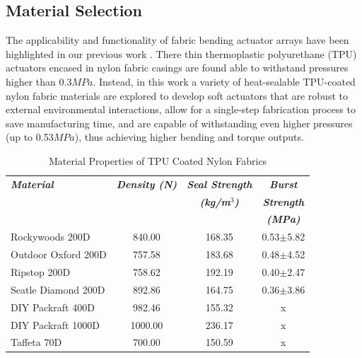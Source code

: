 \documentclass[letterpaper, 10 pt, conference]{ieeeconf}  %
\begin{document}
\subsection{Material Selection}
\label{sec:mat_select}

The applicability and functionality of fabric bending actuator arrays have been highlighted in our previous work \cite{carly2018}. There thin thermoplastic polyurethane (TPU) actuators encased in nylon fabric casings are found able to withstand pressures higher than 0.3$MPa$. Instead, in this work a variety of heat-sealable TPU-coated nylon fabric materials are explored to develop soft actuators that are robust to external environmental interactions, allow for a single-step fabrication process to save manufacturing time, and are capable of withstanding even higher pressures (up to 0.53$MPa$), thus achieving higher bending and torque outputs.
% 

\begin{table}[t!]
\caption{Material Properties of TPU Coated Nylon Fabrics} 
\label{tab:materialproperty_table}
	\begin{tabularx}{0.48\textwidth}{l|c|c|c}   \toprule\toprule
    \small
    \setlength\tabcolsep{11pt}
	\textbf{\emph{Material}} & \textbf{\emph{Density (N) }} & \textbf{\emph{Seal Strength}} & \textbf{\emph{Burst }} \\[-1pt]
                             &                              & \textbf{\emph{(kg/m$^3$)}} & \textbf{\emph{Strength}}\\
                             &                              &                            & \textbf{\emph{(MPa)}}\\\midrule
	Rockywoods 200D 	 &	840.00 		&	168.35 	& 0.53$\pm$5.82 \\
    Outdoor Oxford 200D  &	757.58 		&  	183.68 	& 0.48$\pm$4.52 \\
    Ripstop 200D 		 &	758.62 		& 	192.19 	& 0.40$\pm$2.47	\\
    Seatle Diamond 200D  &	892.86 		& 	164.75	& 0.36$\pm$3.86 \\
    DIY Packraft 400D 	 & 	982.46		& 	155.32 	& x				\\
    DIY Packraft 1000D	 & 	1000.00 	& 	236.17 	& x				\\
    Taffeta 70D 		 &	700.00		& 	150.59  & x				\\\bottomrule 
    \hline
	\end{tabularx}
    \vspace{-6mm}
\end{table}
\end{document}
